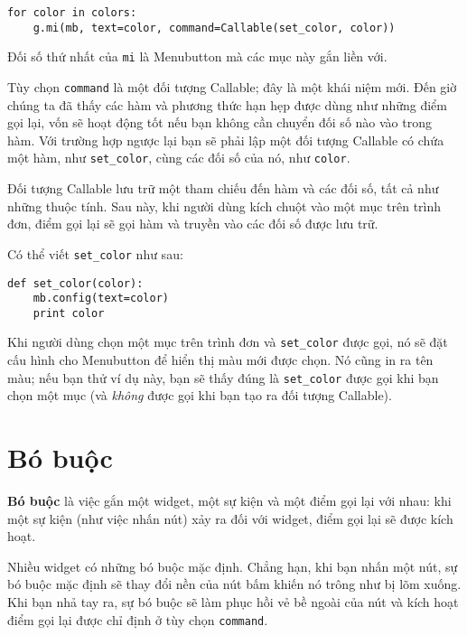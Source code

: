 \documentclass[11pt]{book}
\begin{document}
\beforeverb
\begin{verbatim}
for color in colors:
    g.mi(mb, text=color, command=Callable(set_color, color))
\end{verbatim}
\afterverb
%
Đối số thứ nhất của {\tt mi} là Menubutton mà các mục này gắn liền với.


Tùy chọn {\tt command} là một đối tượng Callable; đây là một khái niệm mới.
Đến giờ chúng ta đã thấy các hàm và phương thức hạn hẹp được dùng như những
điểm gọi lại, vốn sẽ hoạt động tốt nếu bạn không cần chuyển đối số nào vào
trong hàm. Với trường hợp ngược lại bạn sẽ phải lập một đối tượng Callable
có chứa một hàm, như \verb"set_color", cùng các đối số của nó,
như {\tt color}.

Đối tượng Callable lưu trữ một tham chiếu đến hàm và các đối số, tất cả
như những thuộc tính. Sau này, khi người dùng kích chuột vào một mục
trên trình đơn, điểm gọi lại sẽ gọi hàm và truyền vào các đối số được
lưu trữ.

Có thể viết \verb"set_color" như sau:

\beforeverb
\begin{verbatim}
def set_color(color):
    mb.config(text=color)
    print color
\end{verbatim}
\afterverb
%
Khi người dùng chọn một mục trên trình đơn và \verb"set_color" được gọi,
nó sẽ đặt cấu hình cho Menubutton để hiển thị màu mới được chọn.
Nó cũng in ra tên màu; nếu bạn thử ví dụ này, bạn sẽ thấy đúng là 
\verb"set_color" được gọi khi bạn chọn một mục (và {\em không}
được gọi khi bạn tạo ra đối tượng Callable).


\section{Bó buộc}


{\bf Bó buộc} là việc gắn một widget, một sự kiện và một điểm gọi lại
với nhau: khi một sự kiện (như việc nhấn nút) xảy ra đối với widget, 
điểm gọi lại sẽ được kích hoạt.

Nhiều widget có những bó buộc mặc định. Chẳng hạn, khi bạn nhấn
một nút, sự bó buộc mặc định sẽ thay đổi nền của nút bấm khiến nó
trông như bị lõm xuống. Khi bạn nhả tay ra, sự bó buộc sẽ làm
phục hồi vẻ bề ngoài của nút và kích hoạt điểm gọi lại được
chỉ định ở tùy chọn {\tt command}.
\end{document}
